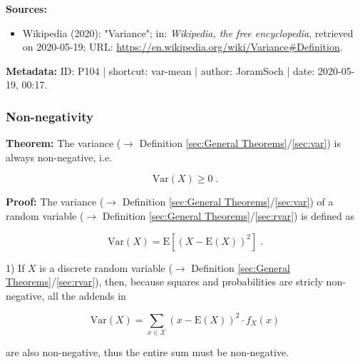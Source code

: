 \documentclass[a4paper,12pt,twoside]{book}
\begin{document}
\vspace{1em}
\textbf{Sources:}
\begin{itemize}
\item Wikipedia (2020): "Variance"; in: \textit{Wikipedia, the free encyclopedia}, retrieved on 2020-05-19; URL: \url{https://en.wikipedia.org/wiki/Variance#Definition}.
\end{itemize}


\vspace{1em}
\textbf{Metadata:} ID: P104 | shortcut: var-mean | author: JoramSoch | date: 2020-05-19, 00:17.
\vspace{1em}



\subsubsection[\textbf{Non-negativity}]{Non-negativity} \label{sec:var-nonneg}
\setcounter{equation}{0}

\textbf{Theorem:} The variance ($\rightarrow$ Definition \ref{sec:General Theorems}/\ref{sec:var}) is always non-negative, i.e.

\begin{equation} \label{eq:var-nonneg-var-nonneg}
\mathrm{Var}(X) \geq 0 \; .
\end{equation}


\vspace{1em}
\textbf{Proof:} The variance ($\rightarrow$ Definition \ref{sec:General Theorems}/\ref{sec:var}) of a random variable ($\rightarrow$ Definition \ref{sec:General Theorems}/\ref{sec:rvar}) is defined as

\begin{equation} \label{eq:var-nonneg-var}
\mathrm{Var}(X) = \mathrm{E}\left[ (X-\mathrm{E}(X))^2 \right] \; .
\end{equation}

\vspace{1em}
1) If $X$ is a discrete random variable ($\rightarrow$ Definition \ref{sec:General Theorems}/\ref{sec:rvar}), then, because squares and probabilities are stricly non-negative, all the addends in

\begin{equation} \label{eq:var-nonneg-var-disc}
\mathrm{Var}(X) = \sum_{x \in \mathcal{X}} (x-\mathrm{E}(X))^2 \cdot f_X(x)
\end{equation}

are also non-negative, thus the entire sum must be non-negative.
\end{document}
